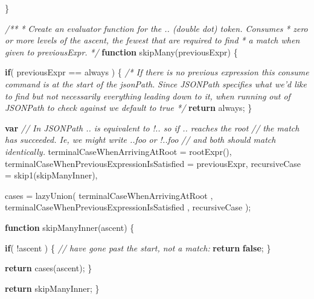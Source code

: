 \documentclass[12pt, ]{article}
\newenvironment{Shaded}{}{}
\newcommand{\KeywordTok}[1]{\textcolor[rgb]{0.00,0.44,0.13}{\textbf{{#1}}}}
\newcommand{\CommentTok}[1]{\textcolor[rgb]{0.38,0.63,0.69}{\textit{{#1}}}}
\newcommand{\FunctionTok}[1]{\textcolor[rgb]{0.02,0.16,0.49}{{#1}}}
\newcommand{\NormalTok}[1]{{#1}}
\begin{document}
\begin{Shaded}
\begin{Highlighting}[]
   \NormalTok{\}   }
   
   \CommentTok{/**}
\CommentTok{    * Create an evaluator function for the .. (double dot) token. Consumes}
\CommentTok{    * zero or more levels of the ascent, the fewest that are required to find}
\CommentTok{    * a match when given to previousExpr.}
\CommentTok{    */}   
   \KeywordTok{function} \FunctionTok{skipMany}\NormalTok{(previousExpr) \{}

      \KeywordTok{if}\NormalTok{( previousExpr == always ) \{}
         \CommentTok{/* If there is no previous expression this consume command }
\CommentTok{            is at the start of the jsonPath.}
\CommentTok{            Since JSONPath specifies what we'd like to find but not }
\CommentTok{            necessarily everything leading down to it, when running}
\CommentTok{            out of JSONPath to check against we default to true */}            
         \KeywordTok{return} \NormalTok{always;}
      \NormalTok{\}}
          
      \KeywordTok{var} 
          \CommentTok{// In JSONPath .. is equivalent to !.. so if .. reaches the root}
          \CommentTok{// the match has succeeded. Ie, we might write ..foo or !..foo}
          \CommentTok{// and both should match identically.}
          \NormalTok{terminalCaseWhenArrivingAtRoot = }\FunctionTok{rootExpr}\NormalTok{(),}
          \NormalTok{terminalCaseWhenPreviousExpressionIsSatisfied = previousExpr, }
          \NormalTok{recursiveCase = }\FunctionTok{skip1}\NormalTok{(skipManyInner),}
          
          \NormalTok{cases = }\FunctionTok{lazyUnion}\NormalTok{(}
                     \NormalTok{terminalCaseWhenArrivingAtRoot}
                  \NormalTok{,  terminalCaseWhenPreviousExpressionIsSatisfied}
                  \NormalTok{,  recursiveCase}
                  \NormalTok{);                        }
            
      \KeywordTok{function} \FunctionTok{skipManyInner}\NormalTok{(ascent) \{}
      
         \KeywordTok{if}\NormalTok{( !ascent ) \{}
            \CommentTok{// have gone past the start, not a match:         }
            \KeywordTok{return} \KeywordTok{false}\NormalTok{;}
         \NormalTok{\}      }
                                                        
         \KeywordTok{return} \FunctionTok{cases}\NormalTok{(ascent);}
      \NormalTok{\}}
      
      \KeywordTok{return} \NormalTok{skipManyInner;}
   \NormalTok{\}      }
   

\end{Highlighting}
\end{Shaded}
\end{document}
